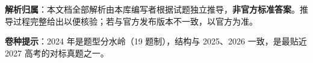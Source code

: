 

\begin{gknotice}
\textbf{解析归属}：本文档全部解析由本库编写者根据试题独立推导，\textbf{非官方标准答案}。推导过程完整给出以便核验；若与官方发布版本不一致，以官方为准。

\textbf{卷种提示}：2024 年是题型分水岭（19 题制），结构与 2025、2026 一致，是最贴近 2027 高考的对标真题之一。
\end{gknotice}

\par\medskip


